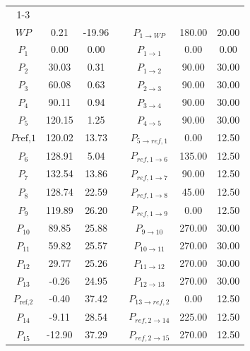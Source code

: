\begin{itemize}
\begin{longtable}{ccc p{8mm} ccc}
            \cmidrule{1-3} \cmidrule{5-7}
            \multicolumn{7}{r}{{Continua nella pagina successiva}} \\
            \endfoot

            \cmidrule{1-3} \cmidrule{5-7}
            \endlastfoot

            $WP$ & 0.21 & -19.96 & & $P_{1 \rightarrow WP}$ & 180.00 & 20.00 \\
            $P_{1}$ & 0.00 & 0.00 & & $P_{1 \rightarrow 1}$ & 0.00 & 0.00 \\
            $P_{2}$ & 30.03 & 0.31 & & $P_{1 \rightarrow 2}$ & 90.00 & 30.00 \\
            $P_{3}$ & 60.08 & 0.63 & & $P_{2 \rightarrow 3}$ & 90.00 & 30.00 \\
            $P_{4}$ & 90.11 & 0.94 & & $P_{3 \rightarrow 4}$ & 90.00 & 30.00 \\
            $P_{5}$ & 120.15 & 1.25 & & $P_{4 \rightarrow 5}$ & 90.00 & 30.00 \\
            $P{\text{ref,1}}$ & 120.02 & 13.73 & & $P_{5 \rightarrow ref,1}$ & 0.00 & 12.50 \\
            $P_{6}$ & 128.91 & 5.04 & & $P_{ref,1 \rightarrow 6}$ & 135.00 & 12.50 \\
            $P_{7}$ & 132.54 & 13.86 & & $P_{ref,1 \rightarrow 7}$ & 90.00 & 12.50 \\
            $P_{8}$ & 128.74 & 22.59 & & $P_{ref,1 \rightarrow 8}$ & 45.00 & 12.50 \\
            $P_{9}$ & 119.89 & 26.20 & & $P_{ref,1 \rightarrow 9}$ & 0.00 & 12.50 \\
            $P_{10}$ & 89.85 & 25.88 & & $P_{9 \rightarrow 10}$ & 270.00 & 30.00 \\
            $P_{11}$ & 59.82 & 25.57 & & $P_{10 \rightarrow 11}$ & 270.00 & 30.00 \\
            $P_{12}$ & 29.77 & 25.26 & & $P_{11 \rightarrow 12}$ & 270.00 & 30.00 \\ 
            $P_{13}$ & -0.26 & 24.95 & & $P_{12 \rightarrow 13}$ & 270.00 & 30.00 \\
            $P_{\text{ref,2}}$ & -0.40 & 37.42 & & $P_{13 \rightarrow ref,2}$ & 0.00 & 12.50 \\
            $P_{14}$ & -9.11 & 28.54 & & $P_{ref,2 \rightarrow 14}$ & 225.00 & 12.50 \\
            $P_{15}$ & -12.90 & 37.29 & & $P_{ref,2 \rightarrow 15}$ & 270.00 & 12.50 \\

\end{longtable}
\end{itemize}
